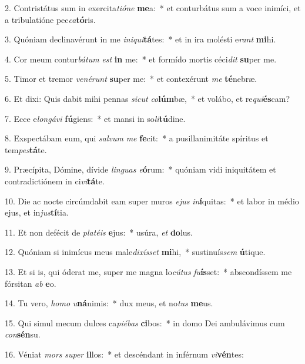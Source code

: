 2. Contristátus sum in exercita\textit{ti}\textit{ó}\textit{ne} \textbf{me}a:~*  et conturbátus sum a voce inimíci, et a tribulatióne pec\textit{ca}\textbf{tó}ris.\

3. Quóniam declinavérunt in me \textit{in}\textit{i}\textit{qui}\textbf{tá}tes:~*  et in ira molésti e\textit{rant} \textbf{mi}hi.\

4. Cor meum contur\textit{bá}\textit{tum} \textit{est} \textbf{in} me:~*  et formído mortis céci\textit{dit} \textbf{su}per me.\

5. Timor et tremor \textit{ve}\textit{né}\textit{runt} \textbf{su}per me:~*  et contexérunt \textit{me} \textbf{té}nebræ.\

6. Et dixi: Quis dabit mihi pennas \textit{sic}\textit{ut} \textit{co}\textbf{lúm}bæ,~*  et volábo, et re\textit{qui}\textbf{és}cam?\

7. Ecce e\textit{lon}\textit{gá}\textit{vi} \textbf{fú}giens:~*  et mansi in so\textit{li}\textbf{tú}dine.\

8. Exspectábam eum, qui \textit{sal}\textit{vum} \textit{me} \textbf{fe}cit:~*  a pusillanimitáte spíritus et tem\textit{pes}\textbf{tá}te.\

9. Præcípita, Dómine, dívide \textit{lin}\textit{guas} \textit{e}\textbf{ó}rum:~*  quóniam vidi iniquitátem et contradictiónem in ci\textit{vi}\textbf{tá}te.\

10. Die ac nocte circúmdabit eam super muros \textit{e}\textit{jus} \textit{in}\textbf{í}quitas:~*  et labor in médio ejus, et in\textit{jus}\textbf{tí}tia.\

11. Et non defécit de \textit{pla}\textit{té}\textit{is} \textbf{e}jus:~*  usúra, \textit{et} \textbf{do}lus.\

12. Quóniam si inimícus meus male\textit{di}\textit{xís}\textit{set} \textbf{mi}hi,~*  sustinuís\textit{sem} \textbf{ú}tique.\

13. Et si is, qui óderat me, super me magna lo\textit{cú}\textit{tus} \textit{fu}\textbf{ís}set:~*  abscondíssem me fórsitan \textit{ab} \textbf{e}o.\

14. Tu vero, \textit{ho}\textit{mo} \textit{u}\textbf{ná}nimis:~*  dux meus, et no\textit{tus} \textbf{me}us.\

15. Qui simul mecum dulces ca\textit{pi}\textit{é}\textit{bas} \textbf{ci}bos:~*  in domo Dei ambulávimus cum \textit{con}\textbf{sén}su.\

16. Véniat \textit{mors} \textit{su}\textit{per} \textbf{il}los:~*  et descéndant in inférnum \textit{vi}\textbf{vén}tes:\

